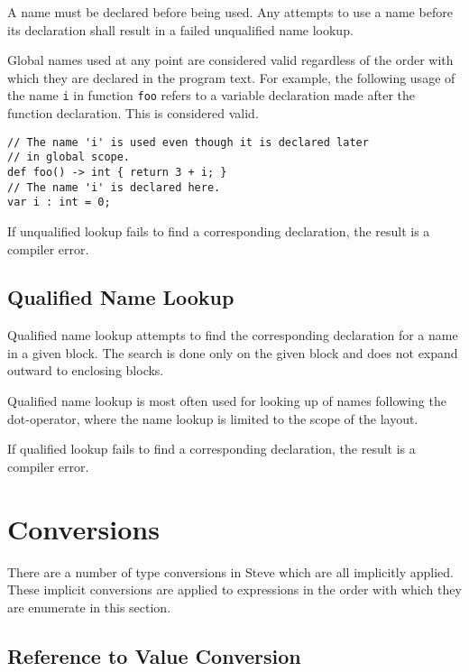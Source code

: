 A name must be declared before being used. Any attempts to use a name before its declaration shall result in a failed unqualified name lookup.

Global names used at any point are considered valid regardless of the order with which they are declared in the program text. For example, the following usage of the name \texttt{i} in function \texttt{foo} refers to a variable declaration made after the function declaration. This is considered valid.

\noindent\begin{minipage}{\linewidth}

\begin{lstlisting}
// The name 'i' is used even though it is declared later
// in global scope.
def foo() -> int { return 3 + i; }
// The name 'i' is declared here.
var i : int = 0;
\end{lstlisting}

\end{minipage}

If unqualified lookup fails to find a corresponding declaration, the result is a compiler error.

\subsection{Qualified Name Lookup} \label{qlfd_lookup}

Qualified name lookup attempts to find the corresponding declaration for a name in a given block. The search is done only on the given block and does not expand outward to enclosing blocks.

Qualified name lookup is most often used for looking up of names following the dot-operator, where the name lookup is limited to the scope of the layout.

If qualified lookup fails to find a corresponding declaration, the result is a compiler error.

\section{Conversions} \label{conversions_guide}

There are a number of type conversions in Steve which are all implicitly applied. These implicit conversions are applied to expressions in the order with which they are enumerate in this section.

\subsection{Reference to Value Conversion} \label{reftoval_conv}

